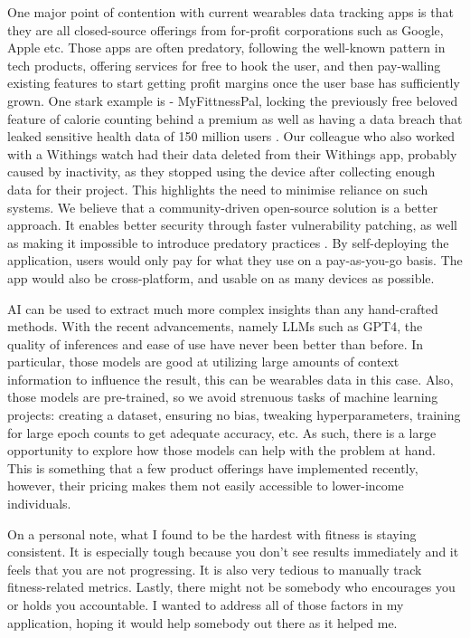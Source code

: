 One major point of contention with current wearables data tracking apps is that they are all closed-source offerings
 from for-profit corporations such as Google, Apple etc.
 Those apps are often predatory, following the well-known pattern in tech products, offering
 services for free to hook the user, and then pay-walling existing features to start getting profit margins once the user base has sufficiently grown. 
 One stark example is - MyFittnessPal, locking the previously free beloved feature of 
 calorie counting behind a premium \cite{myfitnesspalPaywall} as well as having a data breach that leaked sensitive health data of 150 million users \cite{myFitnessPalDataBreach}.
Our colleague who also worked with a Withings watch had their data deleted from their Withings app, probably caused by inactivity, as they stopped using the device after collecting enough data for their project. 
 This highlights the need to minimise reliance on such systems. We believe that a community-driven open-source solution is a better approach. 
 It enables better security through faster vulnerability patching, as well as making it impossible to introduce predatory practices \cite{openSourcePredatoryProtect}. By self-deploying the application, users would only pay for what they use on a pay-as-you-go basis. The app would also be cross-platform, and usable on as many devices as possible.

AI can be used to extract much more complex insights than any hand-crafted methods. With the recent advancements,
 namely LLMs such as GPT4, the quality of inferences and ease of use have never been better than before. In particular,
 those models are good at utilizing large amounts of context information to influence the result, this can be wearables data in this case. Also, those models are pre-trained, so we avoid strenuous tasks of machine learning projects: creating a dataset, ensuring no bias, tweaking hyperparameters, training for large epoch counts to get adequate accuracy, etc.  As such, there is a large opportunity to explore how those models can help with the problem at hand. This is something that a few product offerings 
 have implemented recently, however, their pricing makes them not easily accessible to lower-income individuals. 

On a personal note, what I found to be the hardest with fitness is staying consistent. It is especially tough because you don't 
see results immediately and it feels that you are not progressing. It is also very tedious to manually track fitness-related metrics.
Lastly, there might not be somebody who encourages you or holds you accountable. I wanted to address all of those factors in my application, hoping it would help somebody out there as it helped me.



